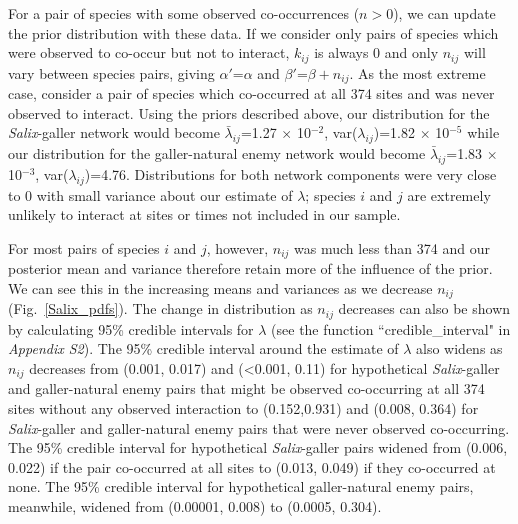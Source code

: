 \documentclass[12pt]{article}
\begin{document}
\begin{spacing}{2.0}
      For a pair of species with some observed co-occurrences ($n>0$), we can update the prior distribution with these data. If we consider only pairs of species which were observed to co-occur but not to interact, $k_{ij}$ is always 0 and only $n_{ij}$ will vary between species pairs, giving $\alpha'$=$\alpha$ and $\beta'$=$\beta + n_{ij}$. As the most extreme case, consider a pair of species which co-occurred at all 374 sites and was never observed to interact. Using the priors described above, our distribution for the \emph{Salix}-galler network would become $\bar\lambda_{ij}$=1.27 $\times$ 10$^{-2}$, var($\lambda_{ij}$)=1.82 $\times$ 10$^{-5}$ while our distribution for the galler-natural enemy network would become $\bar\lambda_{ij}$=1.83 $\times$ 10$^{-3}$, var($\lambda_{ij}$)=4.76. Distributions for both network components were very close to 0 with small variance about our estimate of $\lambda$; species $i$ and $j$ are extremely unlikely to interact at sites or times not included in our sample.


      For most pairs of species $i$ and $j$, however, $n_{ij}$ was much less than 374 and our posterior mean and variance therefore retain more of the influence of the prior. We can see this in the increasing means and variances as we decrease $n_{ij}$ (Fig.~\ref{Salix_pdfs}). The change in distribution as $n_{ij}$ decreases can also be shown  by calculating 95\% credible intervals for $\lambda$ (see the function ``credible\_interval" in \emph{Appendix S2}). The 95\% credible interval around the estimate of $\lambda$ also widens as $n_{ij}$ decreases from (0.001, 0.017) and (\textless0.001, 0.11) for hypothetical \emph{Salix}-galler and galler-natural enemy pairs that might be observed co-occurring at all 374 sites without any observed interaction to (0.152,0.931) and (0.008, 0.364) for \emph{Salix}-galler and galler-natural enemy pairs that were never observed co-occurring. The 95\% credible interval for hypothetical \emph{Salix}-galler pairs widened from (0.006, 0.022) if the pair co-occurred at all sites to (0.013, 0.049) if they co-occurred at none. The 95\% credible interval for hypothetical galler-natural enemy pairs, meanwhile, widened from (0.00001, 0.008) to (0.0005, 0.304).





\end{spacing}
\end{document}
